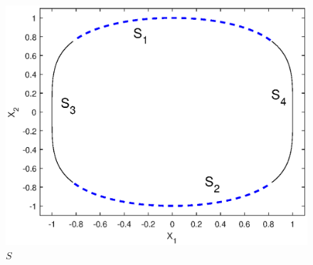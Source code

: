 \documentclass[11pt, letter]{book}
\begin{document}
\begin{figure}[!htb]
    \centering
    \includegraphics[scale=0.6]{S.eps}
    \caption{$S$}
    \label{fig:S}
\end{figure}
\end{document}
